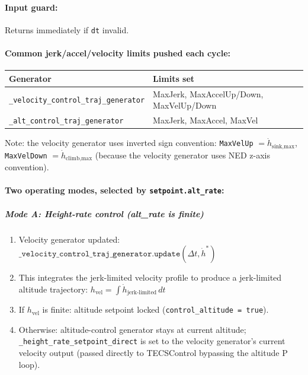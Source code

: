 \documentclass[12pt,a4paper]{article}
\begin{document}
\paragraph{Input guard:} Returns immediately if \texttt{dt} invalid.

\paragraph{Common jerk/accel/velocity limits pushed each cycle:}

\begin{center}
\begin{tabular}{ll}
\toprule
Generator & Limits set \\
\midrule
\texttt{\_velocity\_control\_traj\_generator} & MaxJerk, MaxAccelUp/Down, MaxVelUp/Down \\
\texttt{\_alt\_control\_traj\_generator} & MaxJerk, MaxAccel, MaxVel \\
\bottomrule
\end{tabular}
\end{center}

Note: the velocity generator uses inverted sign convention:
\texttt{MaxVelUp} $= \dot{h}_{\text{sink,max}}$,
\texttt{MaxVelDown} $= \dot{h}_{\text{climb,max}}$
(because the velocity generator uses NED z-axis convention).

\paragraph{Two operating modes, selected by \texttt{setpoint.alt\_rate}:}

\subparagraph{Mode A: Height-rate control (alt\_rate is finite)}

\begin{enumerate}
  \item Velocity generator updated:
        $\texttt{\_velocity\_control\_traj\_generator.update}(\Delta t, \dot{h}^*)$
  \item This integrates the jerk-limited velocity profile to produce a
        jerk-limited altitude trajectory:
        $h_{\text{vel}} = \int \dot{h}_{\text{jerk-limited}}\,dt$
  \item If $h_{\text{vel}}$ is finite: altitude setpoint locked
        (\texttt{control\_altitude = true}).
  \item Otherwise: altitude-control generator stays at current altitude;
        \texttt{\_height\_rate\_setpoint\_direct} is set to the
        velocity generator's current velocity output
        (passed directly to TECSControl bypassing the altitude P loop).
\end{enumerate}
\end{document}
